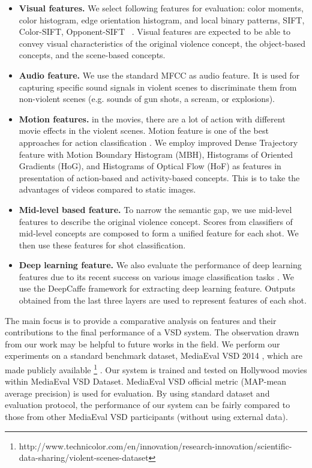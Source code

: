 \documentclass[twocolumn]{bmcart}%
\begin{document}
\begin{itemize}
	\item {\bf Visual features.} We select following features for evaluation: color moments, color histogram, edge orientation histogram, and local binary patterns, SIFT, Color-SIFT, Opponent-SIFT ~\cite{burghouts2009performance}. Visual features are expected to be able to convey visual characteristics of the original violence concept, the object-based concepts, and the scene-based concepts.
	\item {\bf Audio feature.} We use the standard MFCC \cite{rabiner2007introduction} as audio feature. It is used for capturing specific sound signals in violent scenes to discriminate them from non-violent scenes (e.g. sounds of gun shots, a scream, or explosions). 
	\item {\bf Motion features.} in the movies, there are a lot of action with different movie effects in the violent	scenes. Motion feature	is one of the best approaches for action classification \cite{wang2013action}. We employ improved Dense Trajectory \cite{wang2013action} feature with Motion Boundary Histogram (MBH), Histograms of Oriented Gradients (HoG), and Histograms of Optical Flow (HoF) as features in presentation of action-based and activity-based concepts. This is to take the advantages of videos compared to static images.  
	\item {\bf Mid-level based feature.} To narrow the semantic gap, we use mid-level features to describe the original violence concept. Scores from classifiers of mid-level concepts are composed to form a unified feature for each shot. We then use these features for shot classification.
	\item {\bf Deep learning feature.} We also evaluate the performance of deep learning features due to its recent success on various image classification tasks \cite{krizhevsky2012imagenet}. We use the DeepCaffe \cite{jia2014caffe} framework for extracting deep learning feature. Outputs obtained from the last three layers are used to represent features of each shot. 
\end{itemize}
The main focus is to provide a comparative analysis on features and their contributions to the final performance of a VSD system. The observation drawn from our work may be helpful to future works in the field.
\renewcommand{\thefootnote}{\roman{footnote}}
We perform our experiments on a standard benchmark dataset, MediaEval VSD 2014  \cite{demarty2014benchmarking}, which are made publicly available \footnote{http://www.technicolor.com/en/innovation/research-innovation/scientific-data-sharing/violent-scenes-dataset} . Our system is trained and tested on Hollywood movies within MediaEval VSD Dataset. MediaEval VSD official metric (MAP-mean average precision) is used for evaluation. By using standard dataset and evaluation protocol, the performance of our system can be fairly compared to those from other MediaEval VSD participants (without using external data).
\end{document}
